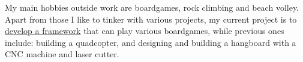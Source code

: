 



My main hobbies outside work are boardgames, rock climbing and beach volley.
Apart from those I like to tinker with various projects, my current project is to {\href{https://github.com/tueboesen/Boardgame_AI}{develop a framework}} that can play various boardgames, while previous ones include: building a quadcopter, and designing and building a hangboard with a CNC machine and laser cutter.


